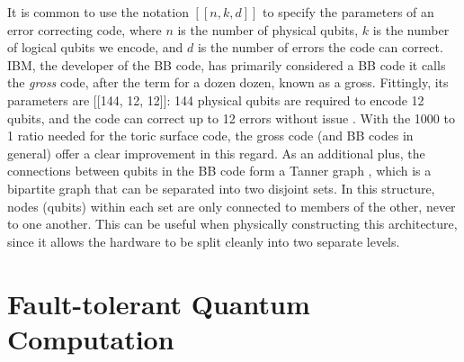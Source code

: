 It is common to use the notation $[[n, k, d]]$ to specify the parameters of an error correcting code, where $n$ is the number of physical qubits, $k$ is the number of logical qubits we encode, and $d$ is the number of errors the code can correct. IBM, the developer of the BB code, has primarily considered a BB code it calls the \emph{gross} code, after the term for a dozen dozen, known as a gross. Fittingly, its parameters are [[144, 12, 12]]: 144 physical qubits are required to encode 12 qubits, and the code can correct up to 12 errors without issue \cite{Bravyi2024}. With the 1000 to 1 ratio needed for the toric surface code, the gross code (and BB codes in general) offer a clear improvement in this regard. As an additional plus, the connections between qubits in the BB code form a Tanner graph \cite{tannergraphwiki}, which is a bipartite graph that can be separated into two disjoint sets. In this structure, nodes (qubits) within each set are only connected to members of the other, never to one another. This can be useful when physically constructing this architecture, since it allows the hardware to be split cleanly into two separate levels.



\chapter{Fault-tolerant Quantum Computation}
